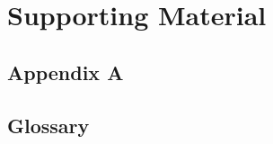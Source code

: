 \chapter{Supporting Material}
\label{app:supporting}


\section{Appendix A}
\lipsum[1]

\section{Glossary}
\label{app:glossary}
\lipsum[2]
